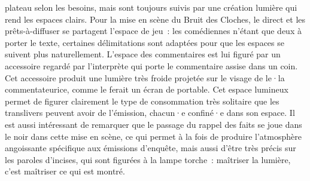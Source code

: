 \documentclass[
]{article}
\begin{document}
plateau selon les besoins, mais sont toujours suivis par une création lumière qui rend les espaces clairs. Pour la mise en scène du Bruit des Cloches, le direct et les prêts-à-diffuser se partagent l'espace de jeu~: les comédiennes n'étant que deux à porter le texte, certaines délimitations sont adaptées pour que les espaces se suivent plus naturellement. L'espace des commentaires est lui figuré par un accessoire regardé par l'interprète qui porte le commentaire assise dans un coin. Cet accessoire produit une lumière très froide projetée sur le visage de le·la commentateurice, comme le ferait un écran de portable. Cet espace lumineux permet de figurer clairement le type de consommation très solitaire que les translivers peuvent avoir de l'émission, chacun·e confiné·e dans son espace. Il est aussi intéressant de remarquer que le passage du rappel des faits se joue dans le noir dans cette mise en scène, ce qui permet à la fois de produire l'atmosphère angoissante spécifique aux émissions d'enquête, mais aussi d'être très précis sur les paroles d'incises, qui sont figurées à la lampe torche~: maîtriser la lumière, c'est maîtriser ce qui est montré.
\end{document}
